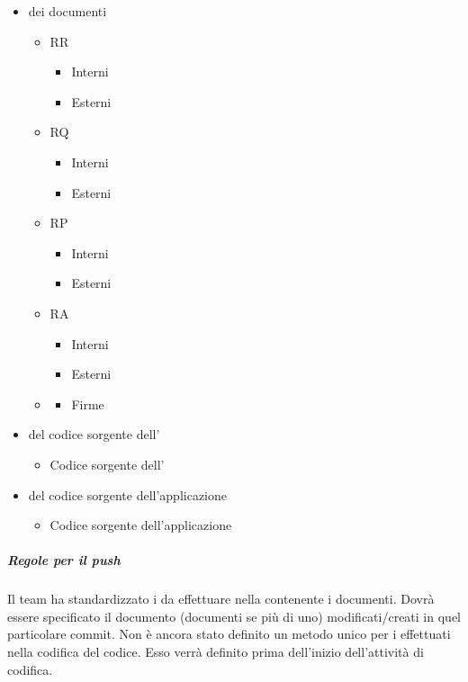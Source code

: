 \begin{itemize}
  \item {} dei documenti
  	\begin{itemize}
  		\item RR
			\begin{itemize}
				\item Interni
				\item Esterni
			\end{itemize}
  		\item RQ
  			\begin{itemize}
				\item Interni
				\item Esterni
			\end{itemize}
  		\item RP
  			\begin{itemize}
				\item Interni
				\item Esterni
			\end{itemize}
  		\item RA
  			\begin{itemize}
				\item Interni
				\item Esterni
			\end{itemize}
  		\item {}   			\begin{itemize}
  				\item Firme
  			\end{itemize}
  	\end{itemize}
  	\item {} del codice sorgente dell'
  		\begin{itemize}
  			\item Codice sorgente dell'
  		\end{itemize}
  	\item {} del codice sorgente dell'applicazione 
  		\begin{itemize}
  			\item Codice sorgente dell'applicazione 
  		\end{itemize}
  	
\end{itemize}

\subparagraph{Regole per il push}
Il team ha standardizzato i  da effettuare nella  contenente i documenti. Dovrà essere specificato il documento (documenti se più di uno) modificati/creati in quel particolare commit. Non è ancora stato definito un metodo unico per i  effettuati nella codifica del codice. Esso verrà definito prima dell'inizio dell'attività di codifica.

